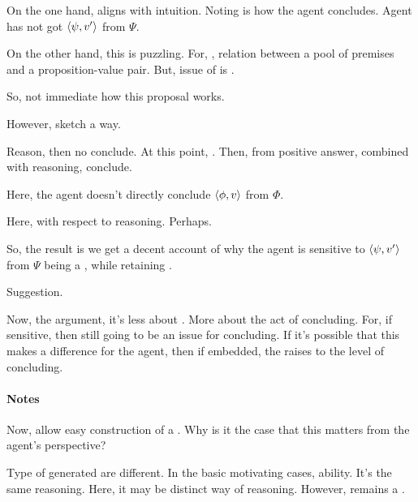 \begin{note}
  On the one hand, aligns with intuition.
  Noting \fc{} is how the agent concludes.
  Agent has not got \(\langle \psi, v' \rangle\) from \(\Psi\).

  On the other hand, this is puzzling.
  For, \support{}, relation between a pool of premises and a proposition-value pair.
  But, issue of \qzS{} is \support{}.

  So, not immediate how this proposal works.

  However, sketch a way.

  Reason, then no conclude.
  At this point, \qzS{}.
  Then, from positive answer, combined with reasoning, conclude.

  Here, the agent doesn't directly conclude \(\langle \phi, v \rangle\) from \(\Phi\).

  Here, \qzS{} with respect to reasoning.
  Perhaps.

  So, the result is we get a decent account of why the agent is sensitive to \(\langle \psi, v' \rangle\) from \(\Psi\) being a \fc{}, while retaining \issueConstraint{}.
\end{note}

\begin{note}
  Suggestion.
  
\end{note}

\begin{note}
  Now, the argument, it's less about .
  More about the act of concluding.
  For, if sensitive, then still going to be an issue for concluding.
  If it's possible that this makes a difference for the agent, then if embedded, the \fc{} raises to the level of concluding.
\end{note}





\paragraph{Notes}

\begin{note}
  Now,  allow easy construction of a \requ{}.
  Why is it the case that this matters from the agent's perspective?
\end{note}

\begin{note}
  Type of  generated are different.
  In the basic motivating cases, ability.
  It's the same reasoning.
  Here, it may be distinct way of reasoning.
  However, remains a \requ{}.
\end{note}

